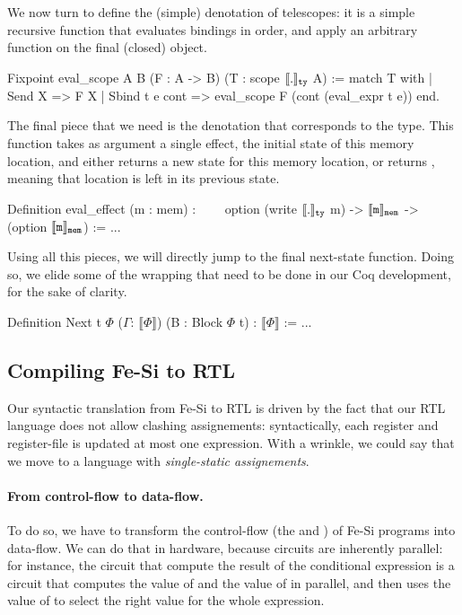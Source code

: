\documentclass[preprint]{sigplanconf}
\newcommand{\denote}[1]{\llbracket #1 \rrbracket}
\begin{document}
We now turn to define the (simple) denotation of telescopes: it is a
simple recursive function that evaluates bindings in order, and apply
an arbitrary function on the final (closed) object. 
\begin{coq}
Fixpoint eval_scope {A B} (F : A -> B) (T : scope $\denotety{.}$ A) :=
match T with 
| Send X => F X
| Sbind t e cont => eval_scope F (cont (eval_expr t e))
end.   
\end{coq}
%
The final piece that we need is the denotation that corresponds to the
 type. This function takes as argument a single effect,
the initial state of this memory location, and either returns a new
state for this memory location, or returns , meaning that
location is left in its previous state.
\begin{coq}
Definition eval_effect (m : mem) : 
$\qquad$option (write $\denotety{.}$ m) -> $\denotemem{m}$ -> (option $\denotemem{m}$) := ... 
\end{coq}
%
Using all this pieces, we will directly jump to the final next-state
function. Doing so, we elide some of the wrapping that need to be done
in our Coq development, for the sake of clarity.
\begin{coq}
Definition Next {t} $\Phi$ ($\Gamma$: $\denote{\Phi}$) (B : Block $\Phi$ t) : $\denote{\Phi}$ := ...
\end{coq}

\subsection{Compiling Fe-Si to RTL} 
Our syntactic translation from Fe-Si to RTL is driven by the fact that
our RTL language does not allow clashing assignements: syntactically,
each register and register-file is updated at most one 
expression.
%
With a wrinkle, we could say that we move to a language with
\emph{single-static assignements}. 

\paragraph{From control-flow to data-flow.}To do so, we have to transform
the control-flow (the  and ) of Fe-Si
programs into data-flow.
%
We can do that in hardware, because circuits are inherently parallel:
for instance, the circuit that compute the result of the conditional
expression \mbox{} is a circuit that computes the value of
 and the value of  in parallel, and then uses the
value of  to select the right value for the whole expression. 
\end{document}
